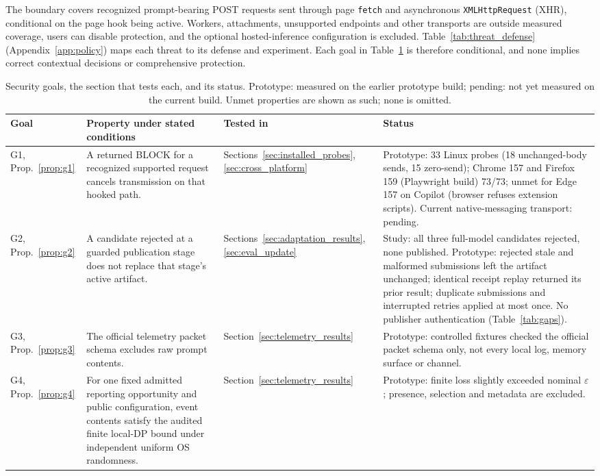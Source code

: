 \documentclass[sigconf]{acmart}
\theoremstyle{acmdefinition}\newtheorem{property}{Property}
\newcommand{\pendingStageThirteen}[1]{#1}
\begin{document}
The boundary covers recognized prompt-bearing POST requests sent through page \texttt{fetch} and asynchronous \texttt{XMLHttpRequest} (XHR), conditional on the page hook being active. Workers, attachments, unsupported endpoints and other transports are outside measured coverage, users can disable protection, and the optional hosted-inference configuration is excluded. Table~\ref{tab:threat_defense} (Appendix~\ref{app:policy}) maps each threat to its defense and experiment. Each goal in Table~\ref{tab:security_goals} is therefore conditional, and none implies correct contextual decisions or comprehensive protection.

\begin{table}[t]
\centering
\caption{Security goals, the section that tests each, and its status. Prototype: measured on the earlier prototype build; pending: not yet measured on the current build. Unmet properties are shown as such; none is omitted.}
\label{tab:security_goals}
\small
\begin{tabular}{p{}p{}p{}p{}}
\toprule
Goal & Property under stated conditions & Tested in & Status \\
\midrule
G1, Prop.~\ref{prop:g1} & A returned BLOCK for a recognized supported request cancels transmission on that hooked path. & Sections~\ref{sec:installed_probes}, \ref{sec:cross_platform} & Prototype: 33 Linux probes (18 unchanged-body sends, 15 zero-send); Chrome 157 and Firefox 159 (Playwright build) 73/73; unmet for Edge 157 on Copilot (browser refuses extension scripts). \pendingStageThirteen{Current native-messaging transport: pending.} \\
G2, Prop.~\ref{prop:g2} & A candidate rejected at a guarded publication stage does not replace that stage's active artifact. & Sections~\ref{sec:adaptation_results}, \ref{sec:eval_update} & Study: all three full-model candidates rejected, none published. Prototype: rejected stale and malformed submissions left the artifact unchanged; identical receipt replay returned its prior result; duplicate submissions and interrupted retries applied at most once. No publisher authentication (Table~\ref{tab:gaps}). \\
G3, Prop.~\ref{prop:g3} & The official telemetry packet schema excludes raw prompt contents. & Section~\ref{sec:telemetry_results} & Prototype: controlled fixtures checked the official packet schema only, not every local log, memory surface or channel. \\
G4, Prop.~\ref{prop:g4} & For one fixed admitted reporting opportunity and public configuration, event contents satisfy the audited finite local-DP bound under independent uniform OS randomness. & Section~\ref{sec:telemetry_results} & Prototype: finite loss slightly exceeded nominal $\varepsilon$; presence, selection and metadata are excluded. \\

\end{tabular}
\end{table}
\end{document}

